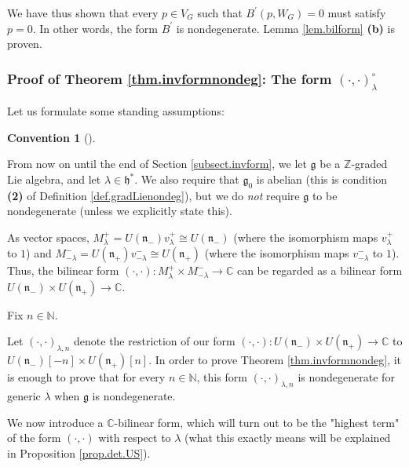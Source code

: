 \documentclass
[numbers=enddot,12pt,final,onecolumn,german,notitlepage]{scrartcl}%
\theoremstyle{definition}
\newtheorem{conv}[theo]{Convention}
\newenvironment{Convention}[1][]
{\begin{conv}[#1]\begin{leftbar}}
{\end{leftbar}\end{conv}}
\begin{document}
We have thus shown that every $p\in V_{G}$ such that $B^{\prime}\left(
p,W_{G}\right)  =0$ must satisfy $p=0$. In other words, the form $B^{\prime}$
is nondegenerate. Lemma \ref{lem.bilform} \textbf{(b)} is proven.

\subsubsection{Proof of Theorem \ref{thm.invformnondeg}: The form $\left(
\cdot,\cdot\right)  _{\lambda}^{\circ}$}

Let us formulate some standing assumptions:

\begin{Convention}
From now on until the end of Section \ref{subsect.invform}, we let
$\mathfrak{g}$ be a $\mathbb{Z}$-graded Lie algebra, and let $\lambda
\in\mathfrak{h}^{\ast}$. We also require that $\mathfrak{g}_{0}$ is abelian
(this is condition \textbf{(2)} of Definition \ref{def.gradLienondeg}), but we
do \textit{not} require $\mathfrak{g}$ to be nondegenerate (unless we
explicitly state this).
\end{Convention}

As vector spaces, $M_{\lambda}^{+}=U\left(  \mathfrak{n}_{-}\right)
v_{\lambda}^{+}\cong U\left(  \mathfrak{n}_{-}\right)  $ (where the
isomorphism maps $v_{\lambda}^{+}$ to $1$) and $M_{-\lambda}^{-}=U\left(
\mathfrak{n}_{+}\right)  v_{-\lambda}^{-}\cong U\left(  \mathfrak{n}%
_{+}\right)  $ (where the isomorphism maps $v_{-\lambda}^{-}$ to $1$). Thus,
the bilinear form $\left(  \cdot,\cdot\right)  :M_{\lambda}^{+}\times
M_{-\lambda}^{-}\rightarrow\mathbb{C}$ can be regarded as a bilinear form
$U\left(  \mathfrak{n}_{-}\right)  \times U\left(  \mathfrak{n}_{+}\right)
\rightarrow\mathbb{C}$.

Fix $n\in\mathbb{N}$.

Let $\left(  \cdot,\cdot\right)  _{\lambda,n}$ denote the restriction of our
form $\left(  \cdot,\cdot\right)  :U\left(  \mathfrak{n}_{-}\right)  \times
U\left(  \mathfrak{n}_{+}\right)  \rightarrow\mathbb{C}$ to $U\left(
\mathfrak{n}_{-}\right)  \left[  -n\right]  \times U\left(  \mathfrak{n}%
_{+}\right)  \left[  n\right]  $. In order to prove Theorem
\ref{thm.invformnondeg}, it is enough to prove that for every $n\in\mathbb{N}%
$, this form $\left(  \cdot,\cdot\right)  _{\lambda,n}$ is nondegenerate for
generic $\lambda$ when $\mathfrak{g}$ is nondegenerate.

We now introduce a $\mathbb{C}$-bilinear form, which will turn out to be the
"highest term" of the form $\left(  \cdot,\cdot\right)  $ with respect to
$\lambda$ (what this exactly means will be explained in Proposition
\ref{prop.det.US}).
\end{document}
